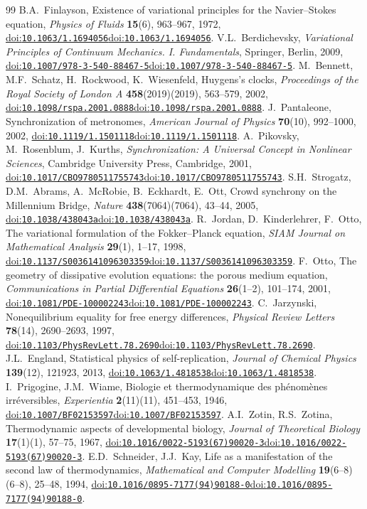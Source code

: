 \documentclass[12pt]{article}
\newif\ifhighlight \highlightfalse
\newif\ifhighlightfirst \highlightfirstfalse
\DeclareRobustCommand{\chg}[1]{\ifhighlight\ifhighlightfirst\textcolor{revised}{#1}\else#1\fi\else#1\fi}
\providecommand{\doi}[1]{\chg{\href{https://doi.org/#1}{doi:\nolinkurl{#1}}}}
\begin{document}
\begin{thebibliography}{99}
 B.A.~Finlayson, Existence of variational principles for the Navier--Stokes equation, \textit{Physics of Fluids} \textbf{15}(6), 963--967, 1972, \doi{10.1063/1.1694056}.
 V.L.~Berdichevsky, \textit{Variational Principles of Continuum Mechanics. I. Fundamentals}, Springer, Berlin, 2009, \doi{10.1007/978-3-540-88467-5}.
 M.~Bennett, M.F.~Schatz, H.~Rockwood, K.~Wiesenfeld, Huygens's clocks, \textit{Proceedings of the Royal Society of London A} \textbf{458}\chg{(2019)}, 563--579, 2002, \doi{10.1098/rspa.2001.0888}.
 J.~Pantaleone, Synchronization of metronomes, \textit{American Journal of Physics} \textbf{70}(10), 992--1000, 2002, \doi{10.1119/1.1501118}.
 A.~Pikovsky, M.~Rosenblum, J.~Kurths, \textit{Synchronization: A Universal Concept in Nonlinear Sciences}, Cambridge University Press, Cambridge, 2001, \doi{10.1017/CBO9780511755743}.
 S.H.~Strogatz, D.M.~Abrams, A.~McRobie, B.~Eckhardt, E.~Ott, Crowd synchrony on the Millennium Bridge, \textit{Nature} \textbf{438}\chg{(7064)}, 43--44, 2005, \doi{10.1038/438043a}.
 R.~Jordan, D.~Kinderlehrer, F.~Otto, The variational formulation of the Fokker--Planck equation, \textit{SIAM Journal on Mathematical Analysis} \textbf{29}(1), 1--17, 1998, \doi{10.1137/S0036141096303359}.
 F.~Otto, The geometry of dissipative evolution equations: the porous medium equation, \textit{Communications in Partial Differential Equations} \textbf{26}(1--2), 101--174, 2001, \doi{10.1081/PDE-100002243}.
 C.~Jarzynski, Nonequilibrium equality for free energy differences, \textit{Physical Review Letters} \textbf{78}(14), 2690--2693, 1997, \doi{10.1103/PhysRevLett.78.2690}.
 J.L.~England, Statistical physics of self-replication, \textit{Journal of Chemical Physics} \textbf{139}(12), 121923, 2013, \doi{10.1063/1.4818538}.
 I.~Prigogine, J.M.~Wiame, Biologie et thermodynamique des ph\'enom\`enes irr\'eversibles, \textit{Experientia} \textbf{2}\chg{(11)}, 451--453, 1946, \doi{10.1007/BF02153597}.
 A.I.~Zotin, R.S.~Zotina, Thermodynamic aspects of developmental biology, \textit{Journal of Theoretical Biology} \textbf{17}\chg{(1)}, 57--75, 1967, \doi{10.1016/0022-5193(67)90020-3}.
 E.D.~Schneider, J.J.~Kay, Life as a manifestation of the second law of thermodynamics, \textit{Mathematical and Computer Modelling} \textbf{19}\chg{(6--8)}, 25--48, 1994, \doi{10.1016/0895-7177(94)90188-0}.
\end{thebibliography}
\end{document}

